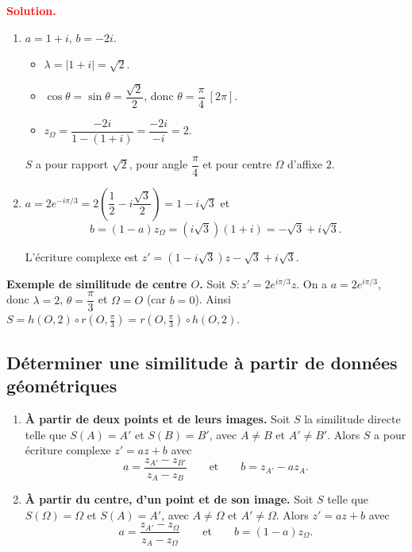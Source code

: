\documentclass[12pt,a4paper]{article}
\newcommand{\zO}{z_{\Omega}}
\newcommand{\solution}{\par\smallskip\noindent\textbf{\textcolor{red}{Solution.}}\par}
\begin{document}
\solution
\begin{enumerate}
  \item $a=1+i$, $b=-2i$.
  \begin{itemize}
    \item $\lambda=|1+i|=\sqrt2$.
    \item $\cos\theta=\sin\theta=\dfrac{\sqrt2}{2}$, donc $\theta=\dfrac{\pi}{4}\ [2\pi]$.
    \item $\zO=\dfrac{-2i}{1-(1+i)}=\dfrac{-2i}{-i}=2$.
  \end{itemize}
  \begin{resultat}
  $S$ a pour rapport $\sqrt2$, pour angle $\dfrac{\pi}{4}$ et pour centre $\Omega$ d'affixe $2$.
  \end{resultat}
  \item $a=2e^{-i\pi/3}=2\left(\dfrac12-i\dfrac{\sqrt3}{2}\right)=1-i\sqrt3$ et
  \[
  b=(1-a)\zO=(i\sqrt3)(1+i)=-\sqrt3+i\sqrt3 .
  \]
  \begin{resultat}
  L'écriture complexe est $z'=(1-i\sqrt3)z-\sqrt3+i\sqrt3$.
  \end{resultat}
\end{enumerate}

\textbf{Exemple de similitude de centre $O$.} Soit $S : z'=2e^{i\pi/3}z$. On a $a=2e^{i\pi/3}$, donc $\lambda=2$, $\theta=\dfrac{\pi}{3}$ et $\Omega=O$ (car $b=0$). Ainsi
$S=h(O,2)\circ r(O,\tfrac{\pi}{3})=r(O,\tfrac{\pi}{3})\circ h(O,2)$.

\subsection{Déterminer une similitude à partir de données géométriques}

\begin{prop}
\begin{enumerate}
  \item \textbf{À partir de deux points et de leurs images.} Soit $S$ la similitude directe telle que $S(A)=A'$ et $S(B)=B'$, avec $A\neq B$ et $A'\neq B'$. Alors $S$ a pour écriture complexe $z'=az+b$ avec
  \[
  a=\frac{z_{A'}-z_{B'}}{z_A-z_B}\qquad\text{et}\qquad b=z_{A'}-az_A .
  \]
  \item \textbf{À partir du centre, d'un point et de son image.} Soit $S$ telle que $S(\Omega)=\Omega$ et $S(A)=A'$, avec $A\neq\Omega$ et $A'\neq\Omega$. Alors $z'=az+b$ avec
  \[
  a=\frac{z_{A'}-\zO}{z_A-\zO}\qquad\text{et}\qquad b=(1-a)\zO .
  \]
\end{enumerate}
\end{prop}
\end{document}
